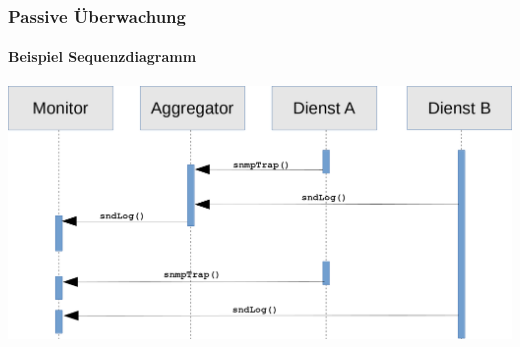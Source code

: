 \begin{frame}
\frametitle{Passive Überwachung}
\framesubtitle{Beispiel Sequenzdiagramm}

\includegraphics[scale=0.25]{img/sequence_uml_passive_trans.png}

\end{frame}
